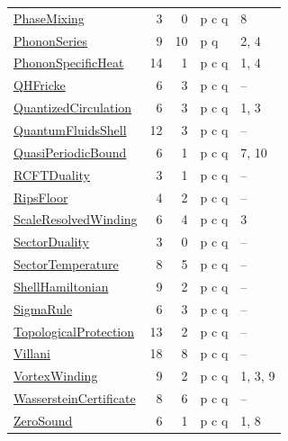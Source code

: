 \begin{table}[p]
\begin{tabular}{@{}lrrll@{}}
\hyperref[appA:PhaseMixing]{PhaseMixing} & 3 & 0 & p c q & 8 \\
\hyperref[appA:PhononSeries]{PhononSeries} & 9 & 10 & p q & 2, 4 \\
\hyperref[appA:PhononSpecificHeat]{PhononSpecificHeat} & 14 & 1 & p c q & 1, 4 \\
\hyperref[appA:QHFricke]{QHFricke} & 6 & 3 & p c q & -- \\
\hyperref[appA:QuantizedCirculation]{QuantizedCirculation} & 6 & 3 & p c q & 1, 3 \\
\hyperref[appA:QuantumFluidsShell]{QuantumFluidsShell} & 12 & 3 & p c q & -- \\
\hyperref[appA:QuasiPeriodicBound]{QuasiPeriodicBound} & 6 & 1 & p c q & 7, 10 \\
\hyperref[appA:RCFTDuality]{RCFTDuality} & 3 & 1 & p c q & -- \\
\hyperref[appA:RipsFloor]{RipsFloor} & 4 & 2 & p c q & -- \\
\hyperref[appA:ScaleResolvedWinding]{ScaleResolvedWinding} & 6 & 4 & p c q & 3 \\
\hyperref[appA:SectorDuality]{SectorDuality} & 3 & 0 & p c q & -- \\
\hyperref[appA:SectorTemperature]{SectorTemperature} & 8 & 5 & p c q & -- \\
\hyperref[appA:ShellHamiltonian]{ShellHamiltonian} & 9 & 2 & p c q & -- \\
\hyperref[appA:SigmaRule]{SigmaRule} & 6 & 3 & p c q & -- \\
\hyperref[appA:TopologicalProtection]{TopologicalProtection} & 13 & 2 & p c q & -- \\
\hyperref[appA:Villani]{Villani} & 18 & 8 & p c q & -- \\
\hyperref[appA:VortexWinding]{VortexWinding} & 9 & 2 & p c q & 1, 3, 9 \\
\hyperref[appA:WassersteinCertificate]{WassersteinCertificate} & 8 & 6 & p c q & -- \\
\hyperref[appA:ZeroSound]{ZeroSound} & 6 & 1 & p c q & 1, 8 \\
\bottomrule\end{tabular}\end{table}
